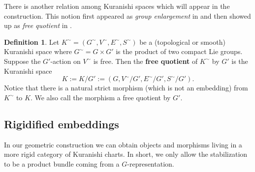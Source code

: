 \documentclass[reqno, 10pt]{amsart}
\numberwithin{equation}{section}
\numberwithin{equation}{section}
\theoremstyle{definition}
\newtheorem{defn}[thm]{Definition}
\theoremstyle{remark}
\newcommand{\beqn}{\begin{equation*}}
\newcommand{\eeqn}{\end{equation*}}
\begin{document}
There is another relation among Kuranishi spaces which will appear in the construction. This notion first appeared as {\it group enlargement} in \cite[Section 4]{AMS} and then showed up as {\it free quotient} in \cite[Lemma 3.5]{AMS2}.

\begin{defn}\label{defn_Kuranishi_free_quotient}
Let $K^\sim = (G^\sim, V^\sim, E^\sim, S^\sim)$ be a (topological or smooth) Kuranishi space where $G^\sim = G \times G'$ is the product of two compact Lie groups. Suppose the $G'$-action on $V^\sim$ is free. Then the {\bf free quotient} of $K^\sim$ by $G'$ is the Kuranishi space
\beqn
K:= K/G':= (G, V^\sim /G', E^\sim /G', S^\sim /G').
\eeqn
Notice that there is a natural strict morphism (which is not an embedding) from $K^\sim$ to $K$. We also call the morphism a free quotient by $G'$.
\end{defn}






\subsection{Rigidified embeddings}

In our geometric construction we can obtain objects and morphisms living in a more rigid category of Kuranishi charts. In short, we only allow the stabilization to be a product bundle coming from a $G$-representation.
\end{document}
